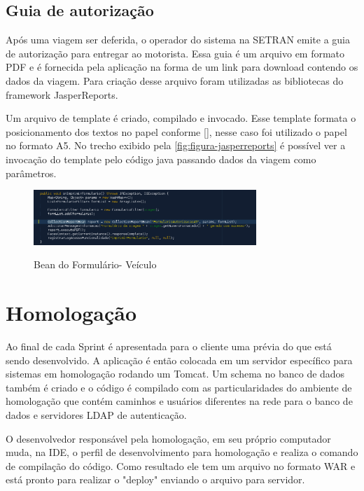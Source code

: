 \subsection{Guia de autorização}
\label{sbs:desenvolvimentoJasper}

Após uma viagem ser deferida, o operador do sistema na SETRAN emite a guia de autorização para entregar ao motorista. Essa guia é um arquivo em formato PDF e é fornecida pela aplicação na forma de um link para download contendo os dados da viagem. Para criação desse arquivo foram utilizadas as bibliotecas do framework JasperReports. 

Um arquivo de template é criado, compilado e invocado. Esse template formata o posicionamento dos textos no papel conforme \autoref{}, nesse caso foi utilizado o papel no formato A5.
No trecho exibido pela \autoref{fig:figura-jasperreports} é possível ver a invocação do template pelo código java passando dados da viagem como parâmetros.


\begin{figure}[!htb]
    \centering
    \caption{Bean do Formulário- Veículo}
    \includegraphics[width=0.75\textwidth]{dados/figuras/veiculos-jasperreports.png}
    \label{fig:figura-jasperreports}
\end{figure}


\section{Homologação}
\label{sec:atividadesRealizadasHomologacao}

Ao final de cada Sprint é apresentada para o cliente uma prévia do que está sendo desenvolvido. A aplicação é então colocada em um servidor específico para sistemas em homologação rodando um Tomcat. Um schema no banco de dados também é criado e o código é compilado com as particularidades do ambiente de homologação que contém caminhos e usuários diferentes na rede para o banco de dados e servidores LDAP de autenticação. 

O desenvolvedor responsável pela homologação, em seu próprio computador muda, na IDE, o perfil de desenvolvimento para homologação e realiza o comando de compilação do código. Como resultado ele tem um arquivo no formato WAR e está pronto para realizar o "deploy" enviando o arquivo para servidor.

